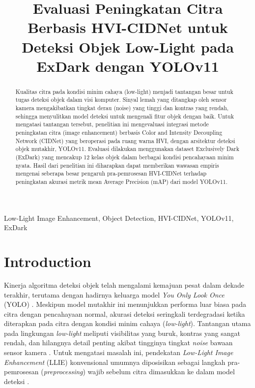 ﻿\documentclass[conference]{IEEEtran}
\begin{document}
\title{Evaluasi Peningkatan Citra Berbasis HVI-CIDNet untuk Deteksi Objek Low-Light pada ExDark dengan YOLOv11}

\author{
}

\maketitle

\begin{abstract}
Kualitas citra pada kondisi minim cahaya (low-light) menjadi tantangan besar untuk tugas deteksi objek dalam visi komputer. Sinyal lemah yang ditangkap oleh sensor kamera mengakibatkan tingkat derau (noise) yang tinggi dan kontras yang rendah, sehingga menyulitkan model deteksi untuk mengenali fitur objek dengan baik. Untuk mengatasi tantangan tersebut, penelitian ini mengevaluasi integrasi metode peningkatan citra (image enhancement) berbasis Color and Intensity Decoupling Network (CIDNet) yang beroperasi pada ruang warna HVI, dengan arsitektur deteksi objek mutakhir, YOLOv11. Evaluasi dilakukan menggunakan dataset Exclusively Dark (ExDark) yang mencakup 12 kelas objek dalam berbagai kondisi pencahayaan minim nyata. Hasil dari penelitian ini diharapkan dapat memberikan wawasan empiris mengenai seberapa besar pengaruh pra-pemrosesan HVI-CIDNet terhadap peningkatan akurasi metrik mean Average Precision (mAP) dari model YOLOv11.
\end{abstract}

\begin{IEEEkeywords}
Low-Light Image Enhancement, Object Detection, HVI-CIDNet, YOLOv11, ExDark
\end{IEEEkeywords}

\section{Introduction}
Kinerja algoritma deteksi objek telah mengalami kemajuan pesat dalam dekade terakhir, terutama dengan hadirnya keluarga model \textit{You Only Look Once} (YOLO) \cite{terven2023yoloreview}. Meskipun model mutakhir ini menunjukkan performa luar biasa pada citra dengan pencahayaan normal, akurasi deteksi seringkali terdegradasi ketika diterapkan pada citra dengan kondisi minim cahaya (\textit{low-light}). Tantangan utama pada lingkungan \textit{low-light} meliputi visibilitas yang buruk, kontras yang sangat rendah, dan hilangnya detail penting akibat tingginya tingkat \textit{noise} bawaan sensor kamera \cite{loh2019exdark}. Untuk mengatasi masalah ini, pendekatan \textit{Low-Light Image Enhancement} (LLIE) konvensional umumnya diposisikan sebagai langkah pra-pemrosesan (\textit{preprocessing}) wajib sebelum citra dimasukkan ke dalam model deteksi \cite{liu2021benchmark}.
\end{document}
